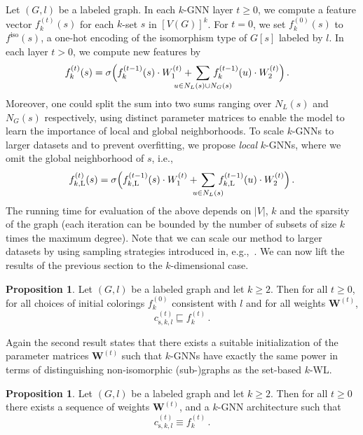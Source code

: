 \documentclass[letterpaper]{article}
\theoremstyle{definition}
\newtheorem{proposition}[theorem]{Proposition}
\begin{document}
Let $(G,l)$ be a labeled graph. 
In each $k$-GNN layer $t \geq 0$, we compute a feature vector $f^{(t)}_{k}(s)$ for each $k$-set $s$ in $[V(G)]^k$. 
For $t=0$, we set $f^{(0)}_{k}(s)$  to  $f^{\text{iso}}(s)$, a one-hot encoding  of the isomorphism type of $G[s]$ labeled by $l$. In each layer $t > 0$,  we compute new features by 
\begin{align*}
	f^{(t)}_{k}(s) =  \sigma & \Big(  f^{(t-1)}_{k}(s) \cdot W_1^{(t)} +\, \sum_{\mathclap{u \in N_L (s) \cup N_G (s)}} \, f^{(t-1)}_{k}(u) \cdot W_2^{(t)}\Big)\,. 
\end{align*}
Moreover, one could split the sum into two sums ranging over $N_L (s)$ and $N_G (s)$ respectively, using distinct parameter matrices to enable the model to learn the importance of local and global neighborhoods. 
To scale $k$-GNNs to larger datasets and to prevent overfitting, we propose \emph{local} $k$-GNNs, where we omit the global neighborhood of  $s$, i.e.,
\begin{equation*}
	f^{(t)}_{k,\text{L}}(s) = \sigma \Big( f^{(t-1)}_{k,\text{L}}(s) \cdot W^{(t)}_1 + \,\sum_{\mathclap{u \in N_{L}(s)}} \, f^{(t-1)}_{k,\text{L}}(u) \cdot  W^{(t)}_2  \Big)\,.
\end{equation*}
The running time for evaluation of the above depends on $|V|$, $k$ and the sparsity of the graph (each iteration can be bounded by the number of subsets of size $k$ times the maximum degree). Note that we can scale our method to larger datasets by using sampling strategies introduced in, e.g.,~\cite{Mor+2017,Ham+2017}. We can now lift the results of the previous section to the $k$-dimensional case. 
\begin{proposition}\label{pro:refines}
	Let $(G, l)$ be a labeled graph and let $k\geq 2$. Then for all $t \ge 0$, for all choices of initial colorings $f_k^{(0)}$ consistent with $l$ and for all weights $\mathbf{W}^{(t)}$,
	\begin{equation*}
		c^{(t)}_{\text{s},k,l} \sqsubseteq f^{(t)}_{k}\,. 
	\end{equation*}
\end{proposition}
Again the second result states that there exists a suitable initialization of the parameter matrices $\mathbf{W}^{(t)}$ such that $k$-GNNs have exactly the same power in terms of distinguishing non-isomorphic (sub-)graphs as the set-based $k$-WL.
\begin{proposition}\label{pro:equality}
	Let $(G, l)$ be a labeled graph and let $k\geq 2$. Then for all $t \geq 0$ there exists a sequence of weights $\mathbf{W}^{(t)}$, and a $k$-GNN architecture such that   
	\begin{equation*}
		c^{(t)}_{\text{s},k,l} \equiv f^{(t)}_{k}\,.
	\end{equation*}		
\end{proposition}
\end{document}
